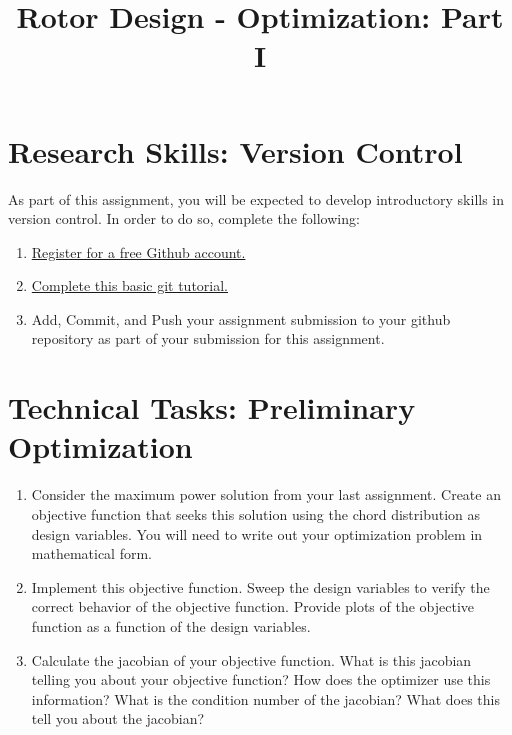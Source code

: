 \documentclass[11pt]{article}
\title{Rotor Design - Optimization: Part I}
\date{}
\begin{document}
	
\maketitle
\vspace{-3.0cm}

\section{Research Skills: Version Control}

As part of this assignment, you will be expected to develop introductory skills in version control.
In order to do so, complete the following:
\begin{enumerate}[label=\alph*.]
	\item \href{https://github.com/}{Register for a free Github account.}
	\item  \href{https://docs.github.com/en/get-started/quickstart/hello-world}{Complete this basic git tutorial.}
	\item Add, Commit, and Push your assignment submission to your github repository as part of your submission for this assignment.
\end{enumerate}
	
	
	
	

\section{Technical Tasks: Preliminary Optimization}

\begin{enumerate}[label=\alph*.]
    \item Consider the maximum power solution from your last assignment. Create an objective function that seeks this solution using the chord distribution as design variables. You will need to write out your optimization problem in mathematical form. 
    \item Implement this objective function. Sweep the design variables to verify the correct behavior of the objective function. Provide plots of the objective function as a function of the design variables.
    \item Calculate the jacobian of your objective function. What is this jacobian telling you about your objective function? How does the optimizer use this information? What is the condition number of the jacobian? What does this tell you about the jacobian?
\end{enumerate}
	
\end{document}
